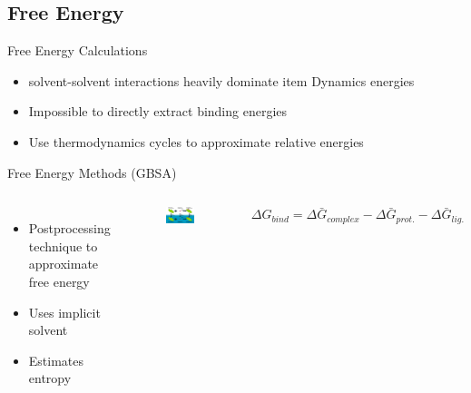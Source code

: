 \subsection{Free Energy}
\begin{frame}{Free Energy Calculations}
\begin{itemize}
	\item solvent-solvent interactions heavily dominate item Dynamics energies
	\vspace{1 cm}
	\item Impossible to directly extract binding energies
	\vspace{1 cm}
	\item Use thermodynamics cycles to approximate relative energies
\end{itemize}
\end{frame}

\begin{frame}{Free Energy Methods (GBSA)}
\begin{columns}
\begin{itemize}
		\item Postprocessing technique to approximate free energy
		\vspace{1 cm}
		\item Uses implicit solvent
		\vspace{1 cm}
		\item Estimates entropy
\end{itemize}
\begin{figure}
\includegraphics[width=0.95\textwidth]{../Graphics/Theory/gbsa}
\end{figure}
\begin{equation}
        \Delta G_{bind} = \Delta \bar{G}_{complex} - \Delta \bar{G}_{prot.} - \Delta \bar{G}_{lig.}
\end{equation}
\end{columns}
\end{frame}

